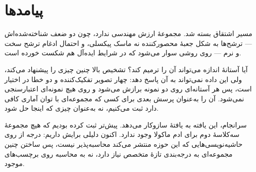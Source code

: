 \section{پیامدها}

مسیر اشتقاق بسته شد. مجموعهٔ  ارزش مهندسی ندارد، چون دو ضعف شناخته‌شده‌اش —
ترشح‌ها به شکل جعبهٔ محصورکننده نه ماسک پیکسلی، و احتمال ادغام ترشح سخت و نرم — روی روشی سوار
می‌شود که در شرایط ایده‌آل هم شکست خورده است.

آیا آستانهٔ اندازه می‌تواند آن را ترمیم کند؟ تشخیص بالا چنین چیزی را پیشنهاد می‌کند، ولی این
داده نمی‌تواند به آن پاسخ دهد: چهار تصویر تفکیک‌کننده و دو خطا در اختیار است، پس هر آستانه‌ای
روی دو نمونه برازش می‌شود و روی هیچ نمونه‌ای اعتبارسنجی نمی‌شود. آن را به‌عنوان پرسش بعدی برای
کسی که مجموعه‌ای با توان آماری کافی دارد ثبت می‌کنیم، نه به‌عنوان چیزی که اینجا حل شود.

سرانجام، این یافته به یافتهٔ  سازوکار می‌دهد. پیش‌تر ثبت کرده بودیم که هیچ مجموعهٔ
سه‌کلاسهٔ دوم برای ادم ماکولا وجود ندارد. اکنون دلیلی برایش داریم: درجه از روی حاشیه‌نویسی‌هایی
که این حوزه منتشر می‌کند محاسبه‌پذیر نیست، پس ساختن چنین مجموعه‌ای به درجه‌بندی تازهٔ متخصص نیاز
دارد، نه به محاسبه روی برچسب‌های موجود.
